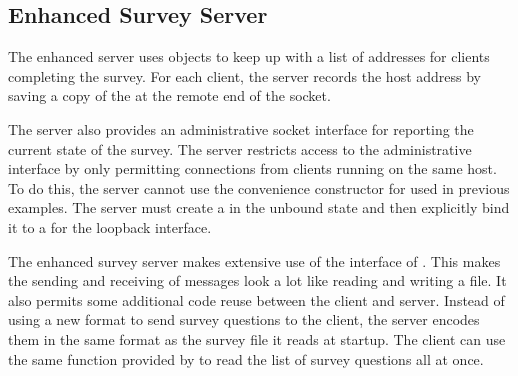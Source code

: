 \subsection{Enhanced Survey Server}

The enhanced server uses  objects to keep
up with a list of addresses for clients completing the survey.
For each client, the server records the host address by saving a
copy of the  at the remote end of the socket.

The server also provides an administrative socket interface for
reporting the current state of the survey.  The server restricts
access to the administrative interface by only permitting connections
from clients running on the same host.  To do this, the server cannot
use the convenience constructor for  used in
previous examples.  The server must create a  in
the unbound state and then explicitly bind it to a
 for the loopback interface.

The enhanced survey server makes extensive use of the
 interface of .  This makes
the sending and receiving of messages look a lot like reading and
writing a file.  It also permits some additional code reuse between
the client and server.  Instead of using a new format to send survey
questions to the client, the server encodes them in the same format as
the survey file it reads at startup.  The client can use the same
 function provided by  to
read the list of survey questions all at once.


